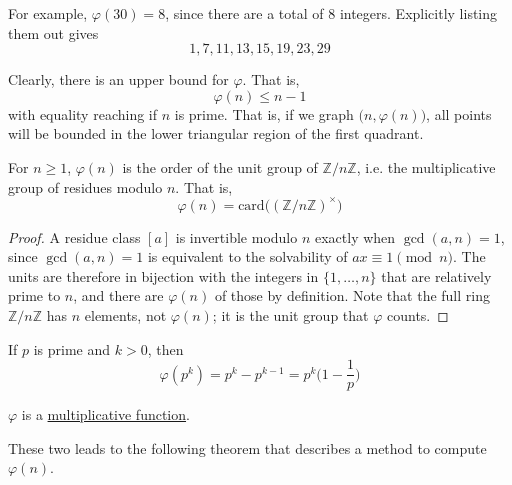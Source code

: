 \documentclass{article}
\newcounter{theorem}[section]
\newcounter{definition}[section]
\newcounter{example}[section]
\begin{document}
For example, $\varphi(30) = 8$, since there are a total of $8$ integers. Explicitly listing them out gives 
\begin{equation}
  1, 7, 11, 13, 15, 19, 23, 29
\end{equation}

Clearly, there is an upper bound for $\varphi$. That is, 
\begin{equation}
  \varphi(n) \leq n-1
\end{equation}
with equality reaching if $n$ is prime. That is, if we graph $\big(n, \varphi(n)\big)$, all points will be bounded in the lower triangular region of the first quadrant. 

\begin{theorem}
  \label{thm:totient-as-the-order-of-the-unit-group}
For $n \geq 1$, $\varphi(n)$ is the order of the unit group of $\mathbb{Z} / n \mathbb{Z}$, i.e. the multiplicative group of residues modulo $n$. That is, 
\begin{equation}
  \varphi(n) = \text{card} \big( (\mathbb{Z} / n \mathbb{Z})^\times \big)
\end{equation}
\end{theorem}
\begin{proof}
A residue class $[a]$ is invertible modulo $n$ exactly when $\gcd(a, n) = 1$, since $\gcd(a,n) = 1$ is equivalent to the solvability of $ax \equiv 1 \pmod n$. The units are therefore in bijection with the integers in $\{1, \ldots, n\}$ that are relatively prime to $n$, and there are $\varphi(n)$ of those by definition. Note that the full ring $\mathbb{Z} / n \mathbb{Z}$ has $n$ elements, not $\varphi(n)$; it is the unit group that $\varphi$ counts. 
\end{proof}

\begin{lemma}
  \label{thm:totient-of-a-prime-power}
If $p$ is prime and $k>0$, then 
\begin{equation}
  \varphi(p^k) = p^k - p^{k-1} = p^k \bigg(1 - \frac{1}{p} \bigg)
\end{equation}
\end{lemma}

\begin{lemma}
  \label{thm:varphi-is-multiplicative}
$\varphi$ is a \hyperref[def:multiplicative-function]{multiplicative function}. 
\end{lemma}

These two leads to the following theorem that describes a method to compute $\varphi(n)$. 
\end{document}
